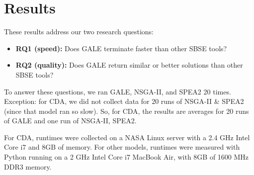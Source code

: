 \documentclass[10pt,journal,compsoc]{IEEEtran}
\newcommand{\bi}{\begin{itemize}}
\newcommand{\ei}{\end{itemize}}
\newcommand{\fig}[1]{Figure~\ref{fig:#1}}
\begin{document}






   
\section{Results}\label{sec:exps}

These results address our two research questions:
\bi
\item 
{\bf RQ1 (speed):} Does GALE terminate faster than other SBSE tools?
\item
{\bf RQ2 (quality):} Does GALE return  similar or better
solutions than other SBSE tools?
\ei




To answer these questions,
we ran GALE, NSGA-II, and SPEA2 20 times.
Exception: for CDA, we did not collect
data for 20 runs of NSGA-II \& SPEA2
(since that model ran so slow).
So, for CDA, the results are
averages for 20 runs of GALE and one run
of NSGA-II, SPEA2.

For CDA, runtimes were collected  on  a NASA Linux server with
a 2.4 GHz Intel Core i7 and 8GB of memory.
For other models,
runtimes were measured with Python  running on 
a 2 GHz Intel Core i7 MacBook Air, with 8GB of 1600 MHz DDR3 memory.
\end{document}
